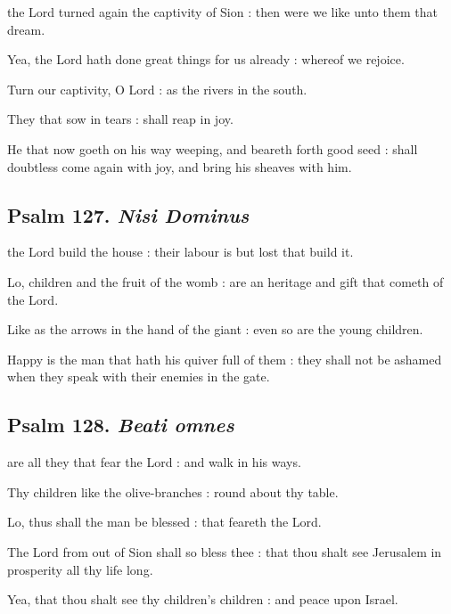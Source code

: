  the Lord turned again the captivity of Sion : then were we like unto them that dream.\par
{}
Yea, the Lord hath done great things for us already : whereof we rejoice.\par
{}Turn our captivity, O Lord : as the rivers in the south.\par
{}They that sow in tears : shall reap in joy.\par
{}He that now goeth on his way weeping, and beareth forth good seed : shall doubtless come again with joy, and bring his sheaves with him.\par

\subsection{Psalm 127. \textit{Nisi Dominus}}

 the Lord build the house : their labour is but lost that build it.\par
{}
Lo, children and the fruit of the womb : are an heritage and gift that cometh of the Lord.\par
{}Like as the arrows in the hand of the giant : even so are the young children.\par
{}Happy is the man that hath his quiver full of them : they shall not be ashamed when they speak with their enemies in the gate.\par

\subsection{Psalm 128. \textit{Beati omnes}}

 are all they that fear the Lord : and walk in his ways.\par
{}
Thy children like the olive-branches : round about thy table.\par
{}Lo, thus shall the man be blessed : that feareth the Lord.\par
{}The Lord from out of Sion shall so bless thee : that thou shalt see Jerusalem in prosperity all thy life long.\par
{}Yea, that thou shalt see thy children's children : and peace upon Israel.\par

